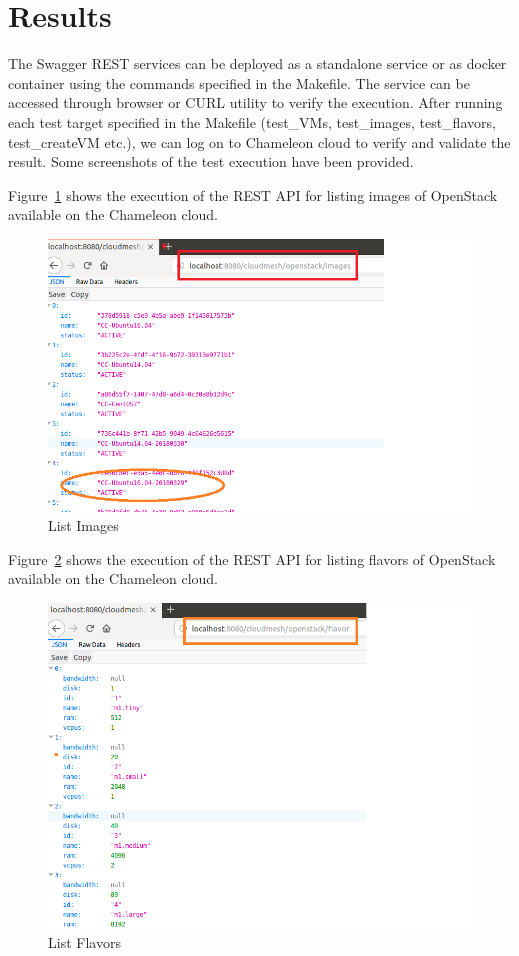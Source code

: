 \section{Results}
The Swagger REST services can be deployed as a standalone service or as docker
container using the commands specified in the Makefile. The service can be
accessed through browser or CURL utility to verify the execution. After running
each test target specified in the Makefile (test\_VMs, test\_images,
test\_flavors, test\_createVM etc.), we can log on to Chameleon cloud to verify
and validate the result. Some screenshots of the test execution have been
provided. 

Figure~\ref{fig:list-images} shows the execution of the REST API for listing
images of OpenStack available on the Chameleon cloud. 

\begin{figure}[!ht]
        \centering\includegraphics[width=\columnwidth]{images/images.png}
        \caption{List Images}\label{fig:list-images}
\end{figure}

Figure~\ref{fig:list-flavors} shows the execution of the REST API for listing
flavors of OpenStack available on the Chameleon cloud. 

\begin{figure}[!ht]
        \centering\includegraphics[width=\columnwidth]{images/flavors.png}
        \caption{List Flavors}\label{fig:list-flavors}
\end{figure}

